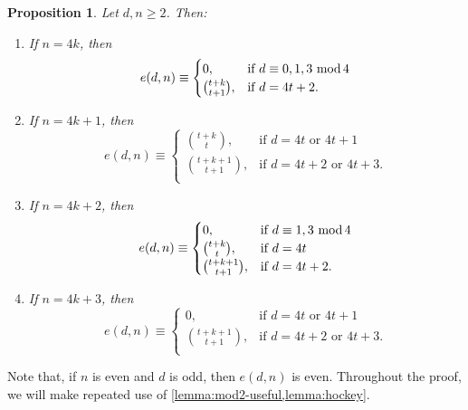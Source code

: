 \documentclass[11pt,a4paper,leqno]{amsart}
\newtheorem{proposition}[theorem]{Proposition}
\theoremstyle{definition}
\theoremstyle{remark}
\newenvironment{clist}[1]
{\begin{enumerate}[\normalfont #1]}
{\end{enumerate}}
\renewcommand{\mod}{\,\,\text{\normalfont mod}\,}
\begin{document}
\begin{proposition} \label{prop:e(d,n)-eval}
Let $d, n \ge 2$. Then:
\begin{clist}{(i)}
\item
If $n = 4k$, then
\[ e(d,n) \equiv 
\begin{cases}
 0	, & \text{if $d \equiv 0,1,3 \mod 4$} \\
 \binom{t+k}{t+1} , & \text{if $d=4t+2$.}
\end{cases}
 \]	
\item
If $n = 4k+1$, then
\[ e(d,n) \equiv 
\begin{cases}
 \binom{t+k}{t}	, & \text{if $d=4t$ or $4t+1$} \\
  \binom{t+k+1}{t+1}, & \text{if $d=4t+2$ or $4t+3$.} \\
\end{cases}
 \]	
\item 
 If $n = 4k+2$, then
\[ e(d,n) \equiv 
\begin{cases}
 0	, & \text{if $d \equiv 1, 3 \mod 4$} \\
 \binom{t+k}{t}	 	, & \text{if $d=4t$} \\
 \binom{t+k+1}{t+1}	, & \text{if $d=4t+2$.} \\
\end{cases}
 \]	
\item
 If $n = 4k+3$, then
\[ e(d,n) \equiv 
\begin{cases}
0	, & \text{if $d=4t$ or $4t+1$} \\
  \binom{t+k+1}{t+1}, & \text{if $d=4t+2$ or $4t+3$.} \\
\end{cases}
 \]	
\end{clist}
\end{proposition}

Note that, if $n$ is even and $d$ is odd, then $e(d,n)$ is even.
Throughout the proof, we will make repeated use of \cref{lemma:mod2-useful,lemma:hockey}.
\end{document}

